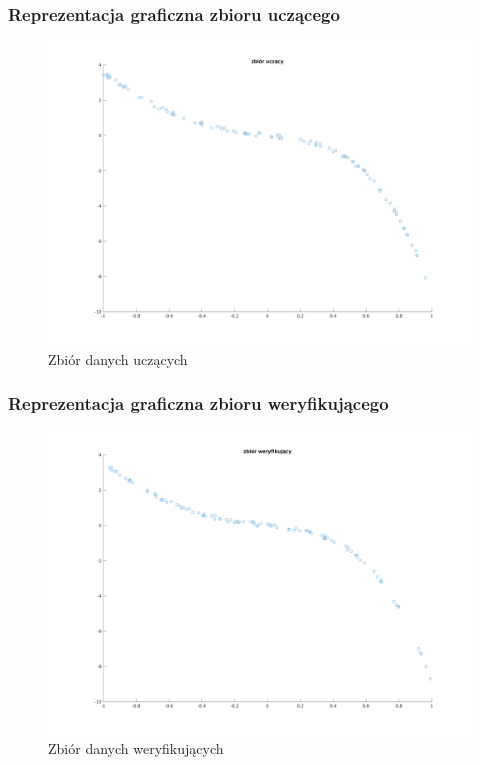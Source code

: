 \documentclass[a4paper, 11pt]{article}
\begin{document}
\subsubsection{Reprezentacja graficzna zbioru uczącego}
\begin{figure}[H]
\centering
\includegraphics[scale=0.50]{dane_stat_ucz.png}
\caption{Zbiór danych uczących }
\label{}
\end{figure}

\subsubsection{Reprezentacja graficzna zbioru weryfikującego}
\begin{figure}[H]
\centering
\includegraphics[scale=0.50]{dane_stat_wer.png}
\caption{Zbiór danych weryfikujących }
\label{}
\end{figure}
\end{document}
